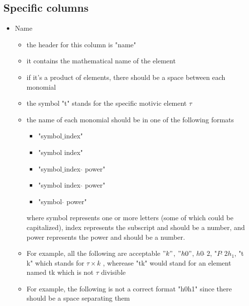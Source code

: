 \documentclass[a4paper,11pt]{article}
\begin{document}
\subsection{Specific columns}	
\begin{itemize}

	\item{Name}
	\begin{itemize}
		\item the header for this column is "name"
		\item it contains the mathematical name of the element
		\item if it's a product of elements, there should be a space between each monomial
		\item the symbol "t" stands for the specific motivic element $\tau$
		\item the name of each monomial should be in one of the following formats
		\begin{itemize}
		\item "symbol$\_$index"
		\item "symbol index"
		\item "symbol$\_$index $\hat{}$ power"
		\item "symbol index $\hat{}$ power"
		\item "symbol $\hat{}$ power"
\end{itemize}		 
where symbol represents one or more letters (some of which could be capitalized), index represents the subscript and should be a number, and power represents the power and should be a number.
		\item For example, all the following are acceptable $" k "$, $" h0 "$, $h0 \ \hat{} \ 2$, "$P \ \hat{} \ 2 h_1$, "t k" which stands for $\tau \times k$  , wherease "tk" would stand for an element named tk which is not $\tau$ divisible
		\item For example, the following is not a correct format "h0h1" since there should be a space separating them
	\end{itemize}
	

\end{itemize}
\end{document}
